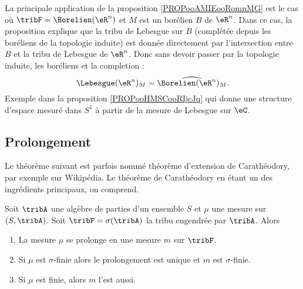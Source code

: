 \begin{normaltext}
    La principale application de la proposition \ref{PROPooAMIEooRomnMG} est le cas où \( \tribF=\Borelien(\eR^n)\) et \( M\) est un borélien \( B\) de \( \eR^n\). Dans ce cas, la proposition explique que la tribu de Lebesgue sur \( B\) (complétée depuis les boréliens de la topologie induite) est donnée directement par l'intersection entre \( B\) et la tribu de Lebesgue de \( \eR^n\). Donc sans devoir passer par la topologie induite, les boréliens et la completion :
    \begin{equation}
        \Lebesgue(\eR^n)_M=\widehat{\Borelien(\eR^n)_M}.
    \end{equation}
    Exemple dans la proposition \ref{PROPooHMSCooRIjcJq} qui donne une structure d'espace mesuré dans \( S^1\) à partir de la mesure de Lebesgue sur \( \eC\).
\end{normaltext}

\subsection{Prolongement}

Le théorème suivant est parfois nommé théorème d'extension de Carathéodory, par exemple sur Wikipédia. Le théorème de Carathéodory en étant un des ingrédients principaux, on comprend.
\begin{theorem}    \label{ThoLCQoojiFfZ}
    Soit \( \tribA\) une algèbre de parties d'un ensemble \( S\) et \( \mu\) une mesure sur \( (S,\tribA)\). Soit \( \tribF=\sigma(\tribA)\) la tribu engendrée par \( \tribA\). Alors
    \begin{enumerate}
        \item
            La mesure \( \mu\) se prolonge en une mesure \( m\) sur \( \tribF\).
        \item
            Si \( \mu\) est \( \sigma\)-finie alors le prolongement est unique et \( m\) est \( \sigma\)-finie.
        \item
            Si \( \mu\) est finie, alors \( m\) l'est aussi.
    \end{enumerate}
\end{theorem}


